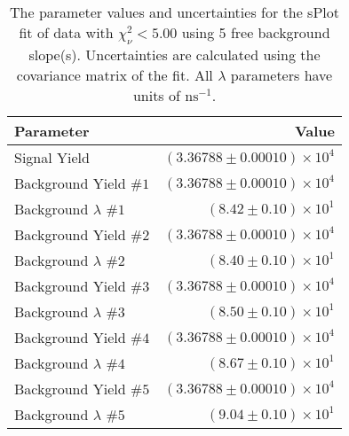 
\begin{table}
    \begin{center}
        \begin{tabular}{lr}\toprule
            Parameter & Value \\\midrule
            Signal Yield & $(3.36788 \pm 0.00010) \times 10^{4}$ \\
            Background Yield $\#1$ & $(3.36788 \pm 0.00010) \times 10^{4}$ \\
            Background $\lambda$ $\#1$ & $(8.42 \pm 0.10) \times 10^{1}$ \\
            Background Yield $\#2$ & $(3.36788 \pm 0.00010) \times 10^{4}$ \\
            Background $\lambda$ $\#2$ & $(8.40 \pm 0.10) \times 10^{1}$ \\
            Background Yield $\#3$ & $(3.36788 \pm 0.00010) \times 10^{4}$ \\
            Background $\lambda$ $\#3$ & $(8.50 \pm 0.10) \times 10^{1}$ \\
            Background Yield $\#4$ & $(3.36788 \pm 0.00010) \times 10^{4}$ \\
            Background $\lambda$ $\#4$ & $(8.67 \pm 0.10) \times 10^{1}$ \\
            Background Yield $\#5$ & $(3.36788 \pm 0.00010) \times 10^{4}$ \\
            Background $\lambda$ $\#5$ & $(9.04 \pm 0.10) \times 10^{1}$ \\\bottomrule
        \end{tabular}
        \caption{The parameter values and uncertainties for the sPlot fit of data with $\chi^2_\nu < 5.00$ using 5 free background slope(s). Uncertainties are calculated using the covariance matrix of the fit. All $\lambda$ parameters have units of $\si{\nano\second}^{-1}$.}
    \end{center}
\end{table}
